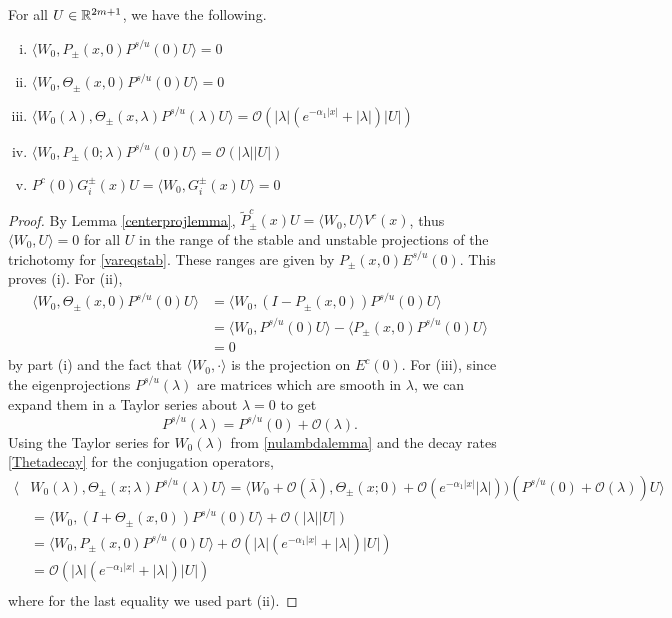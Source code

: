\documentclass[thesis.tex]{subfiles}
\begin{document}
\begin{lemma}\label{W0projlemma}
For all $U \in \mathbb{R}^{2m+1}$, we have the following.
\begin{enumerate}[(i)]
	\item $\langle W_0, P_\pm(x, 0) P^{s/u}(0) U \rangle = 0$
	\item $\langle W_0, \Theta_\pm(x, 0) P^{s/u}(0) U \rangle = 0$
	\item $\langle W_0(\lambda), \Theta_\pm(x, \lambda) P^{s/u}(\lambda) U \rangle  = \mathcal{O}(|\lambda|( e^{-\alpha_1 |x|} + |\lambda|)|U|)$
	\item $\langle W_0, P_\pm(0; \lambda) P^{s/u}(0) U \rangle = \mathcal{O}(|\lambda||U|)$
	\item $P^c(0) G_i^\pm(x) U = \langle W_0, G_i^\pm(x) U\rangle = 0$
\end{enumerate}
\begin{proof}
By Lemma \ref{centerprojlemma}, $\tilde{P}_\pm^c(x)U = \langle W_0, U \rangle V^c(x)$, thus $\langle W_0, U \rangle = 0$ for all $U$ in the range of the stable and unstable projections of the trichotomy for \cref{vareqstab}. These ranges are given by $P_\pm(x, 0) E^{s/u}(0)$. This proves (i). For (ii), 
\begin{align*}
\langle W_0, \Theta_\pm(x, 0) P^{s/u}(0) U\rangle &=
\langle W_0, (I - P_\pm(x, 0)) P^{s/u}(0) U\rangle \\
&= \langle W_0, P^{s/u}(0) U \rangle - \langle P_\pm(x, 0)P^{s/u}(0) U \rangle \\
&= 0
\end{align*}
by part (i) and the fact that $\langle W_0, \cdot \rangle$ is the projection on $E^c(0)$. For (iii), since the eigenprojections $P^{s/u}(\lambda)$ are matrices which are smooth in $\lambda$, we can expand them in a Taylor series about $\lambda = 0$ to get 
\[
P^{s/u}(\lambda) = P^{s/u}(0) + \mathcal{O}(\lambda).
\] 
Using the Taylor series for $W_0(\lambda)$ from \cref{nulambdalemma} and the decay rates \cref{Thetadecay} for the conjugation operators,
\begin{align*}
\langle &W_0(\lambda), \Theta_\pm(x; \lambda) P^{s/u}(\lambda) U \rangle = \langle W_0 + \mathcal{O}(\overline{\lambda}), \Theta_\pm(x; 0) + \mathcal{O}(e^{-\alpha_1 |x|}|\lambda|))(P^{s/u}(0) + \mathcal{O}(\lambda)) U \rangle \\
&= \langle W_0, (I + \Theta_\pm(x, 0))P^{s/u}(0)U \rangle +
\mathcal{O}(|\lambda||U|) \\
&= \langle W_0, P_\pm(x, 0)P^{s/u}(0)U \rangle +
\mathcal{O}(|\lambda|( e^{-\alpha_1 |x|} + |\lambda|)|U|)\\
&= \mathcal{O}(|\lambda|( e^{-\alpha_1 |x|} + |\lambda|)|U|) \\
\end{align*}
where for the last equality we used part (ii). 


\end{proof}
\end{lemma}
\end{document}
